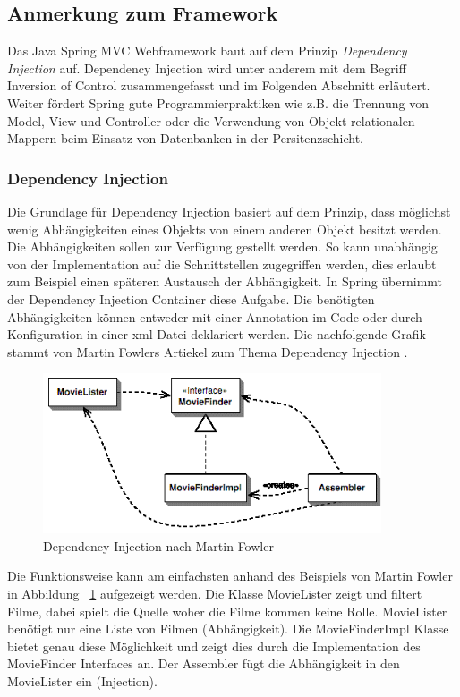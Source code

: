 \subsection{Anmerkung zum Framework}
Das Java Spring MVC Webframework baut auf dem Prinzip \textit{Dependency Injection} auf. Dependency Injection wird unter anderem mit dem Begriff Inversion of Control zusammengefasst und im Folgenden Abschnitt erläutert. Weiter fördert Spring gute Programmierpraktiken wie z.B. die Trennung von Model, View und Controller oder die Verwendung von Objekt relationalen Mappern beim Einsatz von Datenbanken in der Persitenzschicht.

\subsubsection{Dependency Injection}
Die Grundlage für Dependency Injection basiert auf dem Prinzip, dass möglichst wenig Abhängigkeiten eines Objekts von einem anderen Objekt besitzt werden. Die Abhängigkeiten sollen zur Verfügung gestellt werden. So kann unabhängig von der Implementation auf die Schnittstellen zugegriffen werden, dies erlaubt zum Beispiel einen späteren Austausch der Abhängigkeit. In Spring übernimmt der Dependency Injection Container diese Aufgabe. Die benötigten Abhängigkeiten können entweder mit einer Annotation im Code oder durch Konfiguration in einer xml Datei deklariert werden. Die nachfolgende Grafik stammt von Martin Fowlers Artiekel zum Thema Dependency Injection \cite{martinfowler2004}.
\begin{figure}[H]
	\centering
	\includegraphics[width=100mm]{images/tourliveweb/dependencyinjection.png}
	\caption{Dependency Injection nach Martin Fowler \cite{martinfowler2004}}
	\label{fig:dpendencyinjection}
\end{figure}
Die Funktionsweise kann am einfachsten anhand des Beispiels von Martin Fowler in Abbildung ~\ref{fig:dpendencyinjection} aufgezeigt werden. Die Klasse MovieLister zeigt und filtert Filme, dabei spielt die Quelle woher die Filme kommen keine Rolle. MovieLister benötigt nur eine Liste von Filmen (Abhängigkeit). Die MovieFinderImpl Klasse bietet genau diese Möglichkeit und zeigt dies durch die Implementation des MovieFinder Interfaces an. Der Assembler fügt die Abhängigkeit in den MovieLister ein (Injection).
\\

